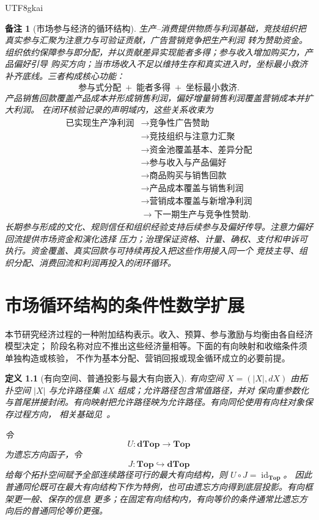\documentclass[12pt,a4paper,openany]{report}
\newtheorem{definition}{定义}[chapter]
\newtheorem{remark}{备注}[chapter]
\begin{document}
\begin{CJK*}{UTF8}{gkai}
\begin{remark}[市场参与经济的循环结构]
生产--消费提供物质与利润基础，竞技组织把真实参与汇聚为注意力与可验证贡献，广告营销竞争把生产利润
转为赞助资金。组织依约保障参与即分配，并以贡献差异实现能者多得；参与收入增加购买力，产品偏好引导
购买方向；当市场收入不足以维持生存和真实进入时，坐标最小救济补齐底线。三者构成核心功能：
\[
  \boxed{\text{参与式分配}\;+\;\text{能者多得}\;+\;\text{坐标最小救济}}.
\]
产品销售回款覆盖产品成本并形成销售利润，偏好增量销售利润覆盖营销成本并扩大利润。
在闭环核验记录的声明域内，这些关系收束为
\[
\boxed{\begin{aligned}
  \text{已实现生产净利润}
  &\longrightarrow\text{竞争性广告赞助}\\
  &\longrightarrow\text{竞技组织与注意力汇聚}\\
  &\longrightarrow\text{资金池覆盖基本、差异分配}\\
  &\longrightarrow\text{参与收入与产品偏好}\\
  &\longrightarrow\text{商品购买与销售回款}\\
  &\longrightarrow\text{产品成本覆盖与销售利润}\\
  &\longrightarrow\text{营销成本覆盖与新增净利润}\\
  &\longrightarrow\text{下一期生产与竞争性赞助}.
\end{aligned}}
\]
长期参与形成的文化、规则信任和组织经验支持后续参与及偏好传导。注意力偏好回流提供市场资金和演化选择
压力；治理保证资格、计量、确权、支付和申诉可执行。资金覆盖、真实回款与可持续再投入把这些作用接入同一个
竞技主导、组织分配、消费回流和利润再投入的闭环循环。
\end{remark}

\appendix
\chapter{市场循环结构的条件性数学扩展}
本节研究经济过程的一种附加结构表示。收入、预算、参与激励与均衡由各自经济模型决定；
阶段名称对应不推出这些经济量相等。下面的有向映射和收缩条件须单独构造或核验，
不作为基本分配、营销回报或现金循环成立的必要前提。


\begin{definition}[有向空间、普通投影与最大有向嵌入]
有向空间 \(X=(|X|,dX)\) 由拓扑空间 \(|X|\) 与允许路径集 \(dX\) 组成；允许路径包含常值路径，并对
保向重参数化与首尾拼接封闭。有向映射把允许路径映为允许路径。有向同伦使用有向柱对象保存过程方向，
相关基础见~\cite{Grandis2003}。

令
\[
  U:\mathbf{dTop}\to\mathbf{Top}
\]
为遗忘方向函子，令
\[
  J:\mathbf{Top}\hookrightarrow\mathbf{dTop}
\]
给每个拓扑空间赋予全部连续路径可行的最大有向结构，则 \(U\circ J=\operatorname{id}_{\mathbf{Top}}\)。
因此普通同伦既可在最大有向结构下作为特例，也可由遗忘方向得到底层投影。有向框架更一般、保存的信息
更多；在固定有向结构内，有向等价的条件通常比遗忘方向后的普通同伦等价更强。


\end{definition}
\end{CJK*}
\end{document}
